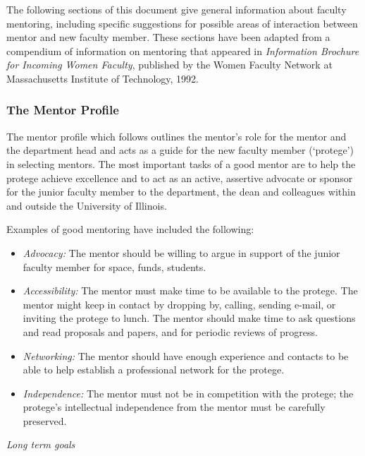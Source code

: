 The following sections of this document give general information about
faculty mentoring, including specific
suggestions for possible areas of interaction
between mentor and new faculty member.
These sections have been adapted from a compendium of information
on mentoring that appeared in 
{\sl Information Brochure for 
Incoming Women Faculty}, published by the 
Women Faculty Network at Massachusetts Institute 
of Technology, 1992.

\subsubsection{The Mentor Profile}
The mentor profile which follows outlines the mentor's role for the mentor 
and the department head and acts as a guide for the new faculty member 
(`protege') in selecting 
mentors. The most important tasks of a good mentor are to help the protege achieve 
excellence and to act as an active, assertive advocate or sponsor for the junior faculty 
member to the department, the dean and colleagues within and outside the 
University of Illinois.


Examples of good mentoring have included the following:

\begin{itemize}

\item
	{\em Advocacy:} 
The mentor should be willing to argue in support of the junior faculty 
member for space, funds, students.
\item
	{\em Accessibility:}
The mentor must make time to be available to the protege. The 
mentor might keep in contact by dropping by, calling, sending e-mail, or 
inviting the protege to lunch. The mentor should make time to ask questions and 
read proposals and papers, and for periodic reviews of progress.
\item
	{\em Networking:}
The mentor should have enough experience and contacts to be able 
to help establish a professional network for the protege.
\item
	{\em Independence:}
The mentor must not be in competition with the protege; the 
protege's intellectual independence from the mentor must be carefully 
preserved.

\end{itemize}



\noindent
{\sl Long term goals}


